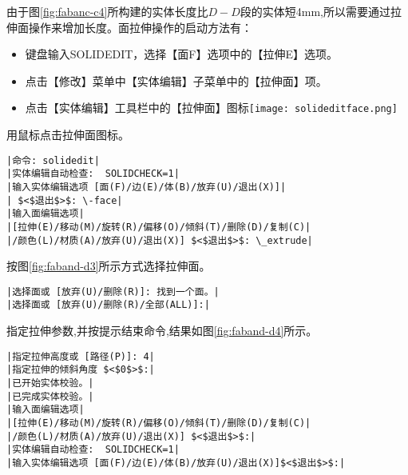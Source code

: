 \begin{procedure}
由于图\ref{fig:fabanc-c4}所构建的实体长度比$D-D$段的实体短4mm,所以需要通过拉伸面操作来增加长度。面拉伸操作的启动方法有：
\begin{itemize}
\item 键盘输入SOLIDEDIT，选择【面F】选项中的【拉伸E】选项。
\item 点击【修改】菜单中【实体编辑】子菜单中的【拉伸面】项。
\item 点击【实体编辑】工具栏中的【拉伸面】图标\texttt{[image: solideditface.png]}
\end{itemize}
用鼠标点击拉伸面图标。
\begin{lstlisting}
|命令: solidedit|
|实体编辑自动检查:  SOLIDCHECK=1|
|输入实体编辑选项 [面(F)/边(E)/体(B)/放弃(U)/退出(X)]|
| $<$退出$>$: \-face|
|输入面编辑选项|
|[拉伸(E)/移动(M)/旋转(R)/偏移(O)/倾斜(T)/删除(D)/复制(C)|
|/颜色(L)/材质(A)/放弃(U)/退出(X)] $<$退出$>$: \_extrude|
\end{lstlisting}
按图\ref{fig:faband-d3}所示方式选择拉伸面。
\begin{lstlisting}
|选择面或 [放弃(U)/删除(R)]: 找到一个面。|
|选择面或 [放弃(U)/删除(R)/全部(ALL)]:|
\end{lstlisting}
指定拉伸参数,并按提示结束命令,结果如图\ref{fig:faband-d4}所示。
\begin{lstlisting}
|指定拉伸高度或 [路径(P)]: 4|
|指定拉伸的倾斜角度 $<$0$>$:|
|已开始实体校验。|
|已完成实体校验。|
|输入面编辑选项|
|[拉伸(E)/移动(M)/旋转(R)/偏移(O)/倾斜(T)/删除(D)/复制(C)|
|/颜色(L)/材质(A)/放弃(U)/退出(X)] $<$退出$>$:|
|实体编辑自动检查:  SOLIDCHECK=1|
|输入实体编辑选项 [面(F)/边(E)/体(B)/放弃(U)/退出(X)]$<$退出$>$:|
\end{lstlisting}
\end{procedure}

\begin{figure}[htbp]
\centering
\begin{floatrow}[3]
\end{floatrow}
\end{figure}
